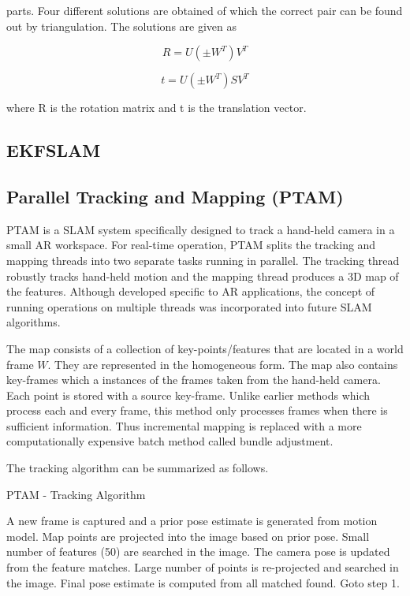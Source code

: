 parts. Four different solutions are obtained of which the correct pair can be found out by triangulation. The solutions are given as

\begin{equation}
	R = U(\pm W^T)V^T
\end{equation}

\begin{equation}	
	t = U(\pm W^T)SV^T
\end{equation}

where R is the rotation matrix and t is the translation vector. 

\subsection{EKFSLAM}

\subsection{Parallel Tracking and Mapping (PTAM)}
\label{ptamtheory}

PTAM is a SLAM system specifically designed to track a hand-held camera in a small AR workspace. For real-time operation, PTAM splits the tracking and mapping threads into two separate tasks running in parallel. The tracking thread robustly tracks hand-held motion and the mapping thread produces a 3D map of the features. Although developed specific to AR applications, the concept of running operations on multiple threads was incorporated into future SLAM algorithms. 

The map consists of a collection of key-points/features that are located in a world frame $W$. They are represented in the homogeneous form. The map also contains key-frames which a instances of the frames taken from the hand-held camera. Each point is stored with a source key-frame. Unlike earlier methods which process each and every frame, this method only processes frames when there is sufficient information. Thus incremental mapping is replaced with a more computationally expensive batch method called bundle adjustment. 

The tracking algorithm can be summarized as follows.

\begin{algorithm}
    \caption{PTAM - Tracking Algorithm}
    \begin{algorithmic}[1]
		\STATE A new frame is captured and a prior pose estimate is generated from motion model.
    	\STATE Map points are projected into the image based on prior pose. 
    	\STATE Small number of features (50) are searched in the image.
    	\STATE The camera pose is updated from the feature matches.
    	\STATE Large number of points is re-projected and searched in the image.
    	\STATE Final pose estimate is computed from all matched found. 
    	\STATE Goto step 1.
    \end{algorithmic}
\end{algorithm}

